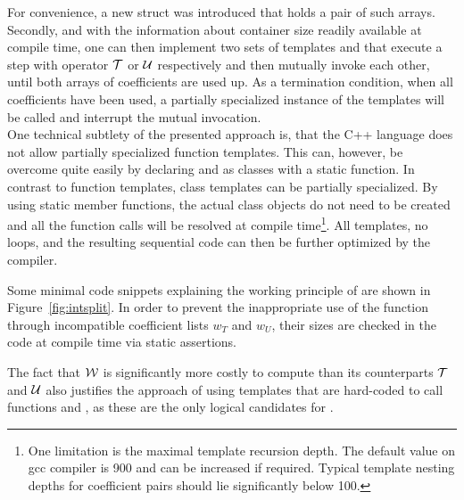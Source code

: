 For convenience, a new struct  was introduced that holds a pair of such arrays.
Secondly, and with the information about container size readily available at compile time, one can then implement two sets of templates  and  that execute a step with operator $\mathcal{T}$ or $\mathcal{U}$ respectively and then mutually invoke each other, until both arrays of coefficients are used up.
As a termination condition, when all coefficients have been used, a partially specialized instance of the templates will be called and interrupt the mutual invocation. \\
%
One technical subtlety of the presented approach is, that the C++ language does not allow partially specialized function templates. This can, however, be overcome quite easily by declaring  and  as classes with a static function.
In contrast to function templates, class templates can be partially specialized.
By using static member functions, the actual class objects do not need to be created and all the function calls will be resolved at compile time\footnote{One limitation is the maximal template recursion depth. The default value on gcc compiler is 900 and can be increased if required. Typical template nesting depths for coefficient pairs should lie significantly below 100.}.
All templates, no loops, and the resulting sequential code can then be further optimized by the compiler.
\par\medskip
%
Some minimal code snippets explaining the working principle of  are shown in Figure~\ref{fig:intsplit}.
%
In order to prevent the inappropriate use of the  function through incompatible coefficient lists $w_T$ and $w_U$, their sizes are checked in the code at compile time via static assertions.
\par\medskip
%
The fact that $\mathcal{W}$ is significantly more costly to compute than its counterparts $\mathcal{T}$ and $\mathcal{U}$ also justifies the approach of using templates that are hard-coded to call functions  and , as these are the only logical candidates for .

